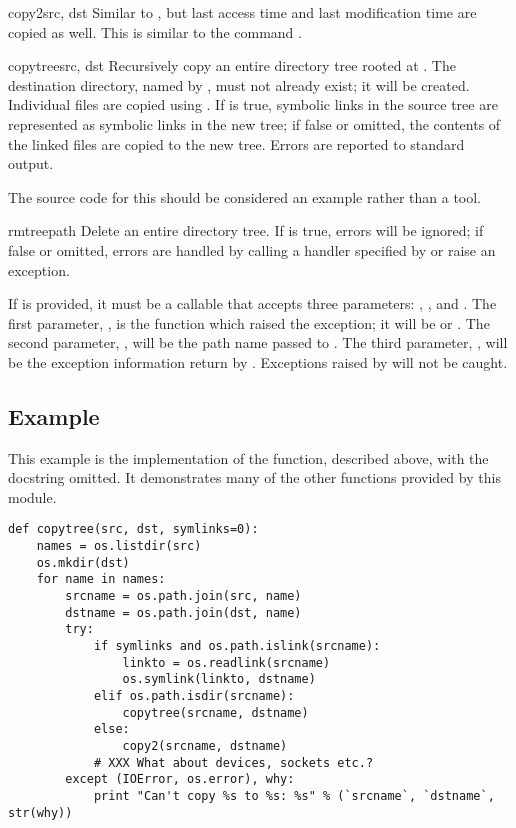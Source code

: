 \begin{funcdesc}{copy2}{src, dst}
  Similar to , but last access time and last
  modification time are copied as well.  This is similar to the
  \UNIX{} command  .
\end{funcdesc}

\begin{funcdesc}{copytree}{src, dst}
  Recursively copy an entire directory tree rooted at .  The
  destination directory, named by , must not already exist;
  it will be created.  Individual files are copied using
  .  If  is true, symbolic links in
  the source tree are represented as symbolic links in the new tree;
  if false or omitted, the contents of the linked files are copied to
  the new tree.  Errors are reported to standard output.

  The source code for this should be considered an example rather than 
  a tool.
\end{funcdesc}

\begin{funcdesc}{rmtree}{path}
  Delete an entire directory tree.  If  is true,
  errors will be ignored; if false or omitted, errors are handled by
  calling a handler specified by  or raise an exception.

  If  is provided, it must be a callable that accepts
  three parameters: , , and .
  The first parameter, , is the function which raised
  the exception; it will be  or
  .  The second parameter, , will be
  the path name passed to .  The third parameter,
  , will be the exception information return by
  .  Exceptions raised by  will
  not be caught.
\end{funcdesc}


\subsection{Example \label{shutil-example}}

This example is the implementation of the 
function, described above, with the docstring omitted.  It
demonstrates many of the other functions provided by this module.

\begin{verbatim}
def copytree(src, dst, symlinks=0):
    names = os.listdir(src)
    os.mkdir(dst)
    for name in names:
        srcname = os.path.join(src, name)
        dstname = os.path.join(dst, name)
        try:
            if symlinks and os.path.islink(srcname):
                linkto = os.readlink(srcname)
                os.symlink(linkto, dstname)
            elif os.path.isdir(srcname):
                copytree(srcname, dstname)
            else:
                copy2(srcname, dstname)
            # XXX What about devices, sockets etc.?
        except (IOError, os.error), why:
            print "Can't copy %s to %s: %s" % (`srcname`, `dstname`, str(why))
\end{verbatim}
